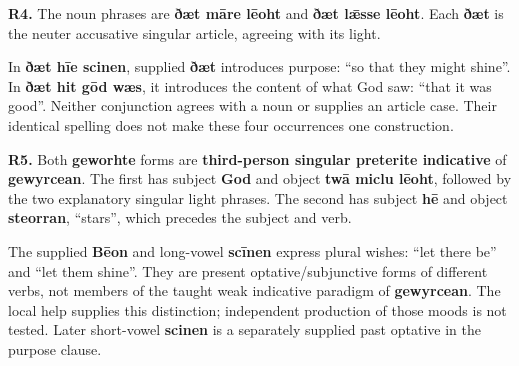 \par\begin{minipage}{\linewidth}\raggedright
\textbf{R4.} The noun phrases are \textbf{ðæt māre lēoht} and \textbf{ðæt lǣsse lēoht}. Each \textbf{ðæt} is the neuter accusative singular article, agreeing with its light.

In \textbf{ðæt hīe scinen}, supplied \textbf{ðæt} introduces purpose: “so that they might shine”. In \textbf{ðæt hit gōd wæs}, it introduces the content of what God saw: “that it was good”. Neither conjunction agrees with a noun or supplies an article case. Their identical spelling does not make these four occurrences one construction.

\end{minipage}\par\addvspace{4pt}

\par\begin{minipage}{\linewidth}\raggedright
\textbf{R5.} Both \textbf{geworhte} forms are \textbf{third-person singular preterite indicative} of \textbf{gewyrcean}. The first has subject \textbf{God} and object \textbf{twā miclu lēoht}, followed by the two explanatory singular light phrases. The second has subject \textbf{hē} and object \textbf{steorran}, “stars”, which precedes the subject and verb.

The supplied \textbf{Bēon} and long-vowel \textbf{scīnen} express plural wishes: “let there be” and “let them shine”. They are present optative/\allowbreak{}subjunctive forms of different verbs, not members of the taught weak indicative paradigm of \textbf{gewyrcean}. The local help supplies this distinction; independent production of those moods is not tested. Later short-vowel \textbf{scinen} is a separately supplied past optative in the purpose clause.

\end{minipage}\par\addvspace{4pt}

